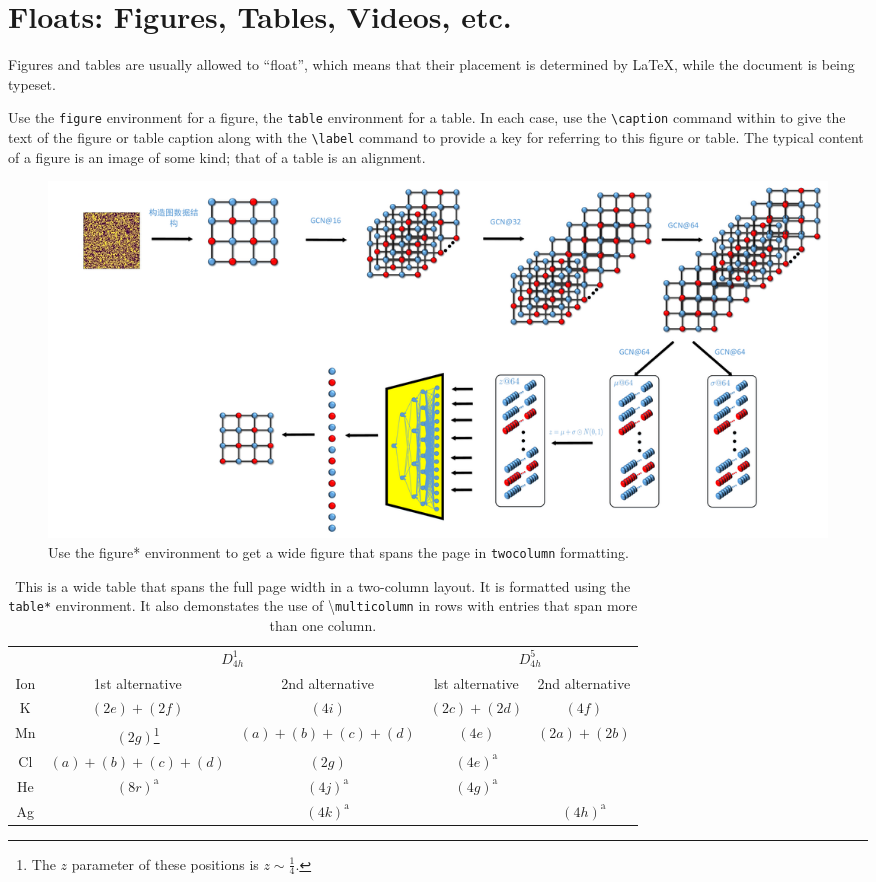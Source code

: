 \documentclass[%
reprint,
amsmath,amssymb,
aps,
]{revtex4-2}
\begin{document}
		\section{Floats: Figures, Tables, Videos, etc.}
		Figures and tables are usually allowed to ``float'', which means that their
		placement is determined by \LaTeX, while the document is being typeset. 
		
		Use the \texttt{figure} environment for a figure, the \texttt{table} environment for a table.
		In each case, use the \verb+\caption+ command within to give the text of the
		figure or table caption along with the \verb+\label+ command to provide
		a key for referring to this figure or table.
		The typical content of a figure is an image of some kind; 
		that of a table is an alignment.%
\begin{figure}
	\includegraphics[scale=0.2]{spin_vgae2}
	\caption{\label{fig:wide}Use the figure* environment to get a wide figure that spans the page in \texttt{twocolumn} formatting.}
	\label{fig:spinvgae2}
\end{figure}
		\begin{table}
			\caption{\label{tab:table3}This is a wide table that spans the full page
				width in a two-column layout. It is formatted using the
				\texttt{table*} environment. It also demonstates the use of
				\textbackslash\texttt{multicolumn} in rows with entries that span
				more than one column.}
			\begin{ruledtabular}
				\begin{tabular}{ccccc}
					&\multicolumn{2}{c}{$D_{4h}^1$}&\multicolumn{2}{c}{$D_{4h}^5$}\\
					Ion&1st alternative&2nd alternative&lst alternative
					&2nd alternative\\ \hline
					K&$(2e)+(2f)$&$(4i)$ &$(2c)+(2d)$&$(4f)$ \\
					Mn&$(2g)$\footnote{The $z$ parameter of these positions is $z\sim\frac{1}{4}$.}
					&$(a)+(b)+(c)+(d)$&$(4e)$&$(2a)+(2b)$\\
					Cl&$(a)+(b)+(c)+(d)$&$(2g)$\footnotemark[1]
					&$(4e)^{\text{a}}$\\
					He&$(8r)^{\text{a}}$&$(4j)^{\text{a}}$&$(4g)^{\text{a}}$\\
					Ag& &$(4k)^{\text{a}}$& &$(4h)^{\text{a}}$\\
				\end{tabular}
			\end{ruledtabular}
		\end{table}
		
\end{document}
